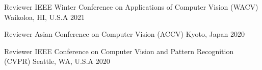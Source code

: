 
\begin{cvhonors}

  \cvhonor
    {Reviewer} %
    {IEEE Winter Conference on Applications of Computer Vision (WACV)} %
    {Waikoloa, HI, U.S.A} %
    {2021} %

  \cvhonor
    {Reviewer} %
    {Asian Conference on Computer Vision (ACCV)} %
    {Kyoto, Japan} %
    {2020} %

  \cvhonor
    {Reviewer} %
    {IEEE Conference on Computer Vision and Pattern Recognition (CVPR)} %
    {Seattle, WA, U.S.A} %
    {2020} %

\end{cvhonors}